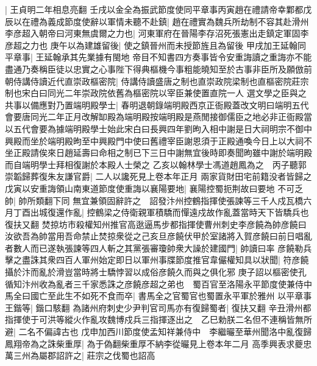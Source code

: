 |{
	王貞明二年相息亮翻}
壬戌以金全為振武節度使同平章事丙寅趙在禮請帝幸鄴都戊辰以在禮為義成節度使辭以軍情未聽不赴鎮|{
	趙在禮實為魏兵所劫制不容其赴滑州}
李彦超入朝帝曰河東無虞爾之力也|{
	河東軍府在晉陽李存沼死張憲出走鎮定軍固李彦超之力也}
庚午以為建雄留後|{
	使之鎮晉州而未授節旌且為留後}
甲戌加王延翰同平章事|{
	王延翰承其先業據有閩地}
帝目不知書四方奏事皆令安重誨讀之重誨亦不能盡通乃奏稱臣徒以忠實之心事陛下得典樞機今事粗能曉知至於古事非臣所及願倣前朝侍講侍讀近代直崇政樞密院|{
	侍講侍讀盛唐之制也直崇政院梁制也直樞密院莊宗制也宋白曰同光二年崇政院依舊為樞密院以宰臣兼使置直院一人}
選文學之臣與之共事以備應對乃置端明殿學士|{
	春明退朝錄端明殿西京正衙殿蓋改文明曰端明五代會要唐同光二年正月改解缷殿為端明殿按端明殿是燕閒接御儒臣之地必非正衙殿當以五代會要為據端明殿學士始此宋白曰長興四年劉昫入相中謝是日大祠明宗不御中興殿而坐於端明殿昫至中興殿門中使曰舊禮宰臣謝恩須于正殿通喚今日上以大祠不坐正殿請俟來日趙延壽曰命相之制已下三日中謝無宜後時即奏聞昫雖中謝於端明殿而自端明學士拜相復謝於本殿人士榮之}
乙亥以翰林學士馮道趙鳳為之　丙子聽郭崇韜歸葬復朱友謙官爵|{
	二人以讒死見上卷本年正月}
兩家貨財田宅前籍没者皆歸之　戊寅以安重誨領山南東道節度使重誨以襄陽要地|{
	襄陽控蜀扼荆故曰要地}
不可乏帥|{
	帥所類翻下同}
無宜兼領固辭許之　詔發汴州控鶴指揮使張諫等三千人戍瓦橋六月丁酉出城復還作亂|{
	控鶴梁之侍衛親軍積驕而憚遠戍故作亂蓋當時天下皆驕兵也復扶又翻}
焚掠坊市殺權知州推官高逖逼馬步都指揮使曹州刺史李彦饒為帥彦饒曰汝欲吾為帥當用吾命禁止焚掠衆從之己亥旦彦饒伏甲於室諸將入賀彦饒曰前日唱亂者數人而已遂執張諫等四人斬之其黨張審瓊帥衆大譟於建國門|{
	帥讀曰率}
彦饒勒兵擊之盡誅其衆四百人軍州始定即日以軍州事牒節度推官韋儼權知具以狀聞|{
	符彦饒攝於汴而亂於滑豈當時將士驕悖習以成俗彦饒久而與之俱化邪}
庚子詔以樞密使孔循知汴州收為亂者三千家悉誅之彦饒彦超之弟也　蜀百官至洛陽永平節度使兼侍中馬全曰國亡至此生不如死不食而卒|{
	書馬全之官蜀官也蜀置永平軍於雅州}
以平章事王鍇等|{
	鍇口駭翻}
為諸州府刺史少尹判官司馬亦有復歸蜀者|{
	復扶又翻}
辛丑滑州都指揮使于可洪等縱火作亂攻魏博戍兵三指揮逐出之　乙巳勅朕二名但不連稱皆無所避|{
	二名不偏諱古也}
戊申加西川節度使孟知祥兼侍中　李繼曮至華州聞洛中亂復歸鳳翔帝為之誅柴重厚|{
	為于偽翻柴重厚不納李從曮見上卷本年二月}
高季興表求夔忠萬三州為屬郡詔許之|{
	莊宗之伐蜀也詔高}


